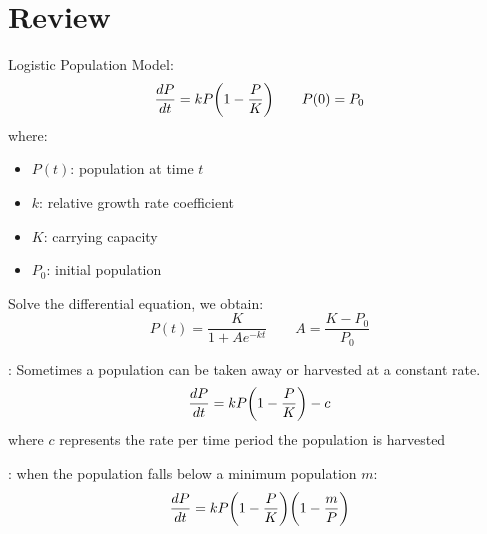 \chapter{Review}

    \par Logistic Population Model:
      \[
        \dfrac{d P}{d t} = kP\bigg(1 - \frac{P}{K}\bigg) \qquad P(0) = P_0
      \]
      where:
      \begin{itemize}
        \item $P(t)$: population at time $t$
        \item $k$: relative growth rate coefficient
        \item $K$: carrying capacity
        \item $P_0$: initial population
      \end{itemize}
    \par Solve the differential equation, we obtain:
      \[
        P(t) = \frac{K}{1 + Ae^{-kt}} \qquad A = \frac{K - P_0}{P_0}
      \]
  
    \par {}: Sometimes a population can be taken
    away or harvested at a constant rate.
    \[
      \dfrac{d P}{d t} = kP\bigg(1 - \frac{P}{K}\bigg) - c
    \]
    where $c$ represents the rate per time period the population is harvested
    \par {}: when the population falls below a minimum population $m$:
    \[
      \dfrac{d P}{d t} = kP\bigg(1 - \frac{P}{K}\bigg)\bigg(1 - \frac{m}{P}\bigg)
    \]